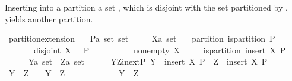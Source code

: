 \begin{isabellebody}
\endisatagproof
{\isafoldproof}%
%
\isadelimproof
%
\endisadelimproof
%
\begin{isamarkuptext}%
Inserting into a partition  a set , which is disjoint with the set 
  partitioned by , yields another partition.%
\end{isamarkuptext}%
\isamarkuptrue%
\isamarkupfalse%
\ partition{\isacharunderscore}extension{}{\isacharcolon}\isanewline
\ \ \ P{\isacharcolon}{\isacharcolon}{\isachardoublequoteopen}{\isacharprime}a\ set\ set{\isachardoublequoteclose}\isanewline
\ \ \ \ \ X{\isacharcolon}{\isacharcolon}{\isachardoublequoteopen}{\isacharprime}a\ set{\isachardoublequoteclose}\isanewline
\ \ \ partition{\isacharcolon}\ {\isachardoublequoteopen}is{\isacharunderscore}partition\ P{\isachardoublequoteclose}\isanewline
\ \ \ \ \ \ \ disjoint{\isacharcolon}\ {\isachardoublequoteopen}X\ {\isasyminter}\ {\isasymUnion}\ P\ {\isacharequal}\ {\isacharbraceleft}{\isacharbraceright}{\isachardoublequoteclose}\ \isanewline
\ \ \ \ \ \ \ non{\isacharunderscore}empty{\isacharcolon}\ {\isachardoublequoteopen}X\ {\isasymnoteq}\ {\isacharbraceleft}{\isacharbraceright}{\isachardoublequoteclose}\isanewline
\ \ \ {\isachardoublequoteopen}is{\isacharunderscore}partition\ {\isacharparenleft}insert\ X\ P{\isacharparenright}{\isachardoublequoteclose}\isanewline
%
\isadelimproof
%
\endisadelimproof
%
\isatagproof
{}\isamarkupfalse%
\ {\isacharminus}\isanewline
\ \ \isacommand{{\isacharbraceleft}}\isamarkupfalse%
\isanewline
\ \ \ \ \isamarkupfalse%
\ Y{\isacharcolon}{\isacharcolon}{\isachardoublequoteopen}{\isacharprime}a\ set{\isachardoublequoteclose}\ \ Z{\isacharcolon}{\isacharcolon}{\isachardoublequoteopen}{\isacharprime}a\ set{\isachardoublequoteclose}\isanewline
\ \ \ \ \isamarkupfalse%
\ Y{\isacharunderscore}Z{\isacharunderscore}in{\isacharunderscore}ext{\isacharunderscore}P{\isacharcolon}\ {\isachardoublequoteopen}Y\ {\isasymin}\ insert\ X\ P\ {\isasymand}\ Z\ {\isasymin}\ insert\ X\ P{\isachardoublequoteclose}\isanewline
\ \ \ \ \isamarkupfalse%
\ {\isachardoublequoteopen}Y\ {\isasyminter}\ Z\ {\isasymnoteq}\ {\isacharbraceleft}{\isacharbraceright}\ {\isasymlongleftrightarrow}\ Y\ {\isacharequal}\ Z{\isachardoublequoteclose}\isanewline
\ \ \ \ \isamarkupfalse%
\isanewline
\ \ \ \ \ \ \isamarkupfalse%
\ {\isachardoublequoteopen}Y\ {\isasyminter}\ Z\ {\isasymnoteq}\ {\isacharbraceleft}{\isacharbraceright}{\isachardoublequoteclose}\isanewline

\end{isabellebody}
